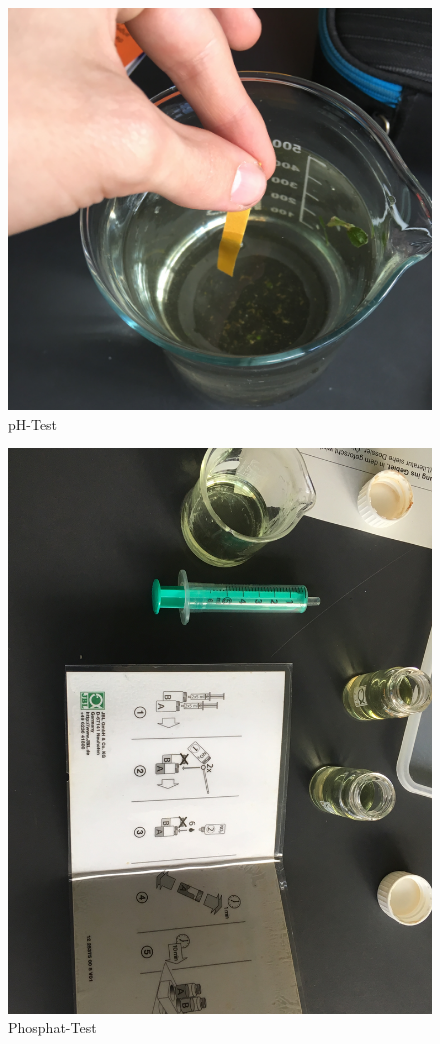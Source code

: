\documentclass{article}
\begin{document}
        
        \begin{figure}[h!]
        \centering
        \includegraphics[scale=0.1]{pH-test.jpg}
        \caption{pH-Test}
        \label{fig:universe}
        \end{figure}
        
        \begin{figure}[h!]
        \centering
        \includegraphics[scale=0.1]{Phosphat-test.JPG}
        \caption{Phosphat-Test}
        \label{fig:universe}
        \end{figure}
        
\end{document}

